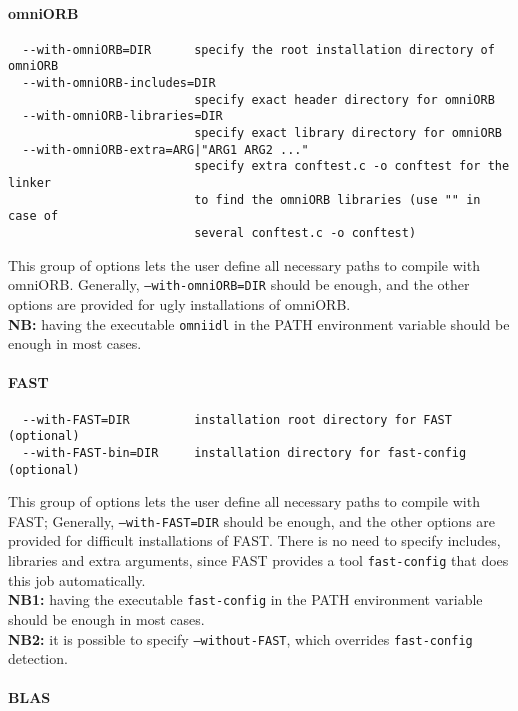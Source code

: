 \paragraph{omniORB}
{\footnotesize
\begin{verbatim}
  --with-omniORB=DIR      specify the root installation directory of omniORB
  --with-omniORB-includes=DIR
                          specify exact header directory for omniORB
  --with-omniORB-libraries=DIR
                          specify exact library directory for omniORB
  --with-omniORB-extra=ARG|"ARG1 ARG2 ..."
                          specify extra conftest.c -o conftest for the linker
                          to find the omniORB libraries (use "" in case of 
                          several conftest.c -o conftest)
\end{verbatim}
}
\noindent This group of options lets the user define all necessary
paths to compile with omniORB. Generally, \texttt{--with-omniORB=DIR}
should be enough, and the other options are provided for ugly
installations of omniORB.\\ \textbf{NB:} having the executable
\texttt{omniidl} in the PATH environment variable should be enough in
most cases.

\paragraph{FAST}\label{fast_compil}
{\footnotesize
\begin{verbatim}
  --with-FAST=DIR         installation root directory for FAST (optional)
  --with-FAST-bin=DIR     installation directory for fast-config (optional)
\end{verbatim}
}
\noindent This group of options lets the user define all necessary
paths to compile with FAST; Generally, \texttt{--with-FAST=DIR} should
be enough, and the other options are provided for difficult
installations of FAST. There is no need to specify includes, libraries
and extra arguments, since FAST provides a tool \texttt{fast-config}
that does this job automatically.\\ \textbf{NB1:} having the
executable \texttt{fast-config} in the PATH environment variable
should be enough in most cases.\\ \textbf{NB2:} it is possible to
specify \texttt{--without-FAST}, which overrides \texttt{fast-config}
detection.

\paragraph{BLAS}

